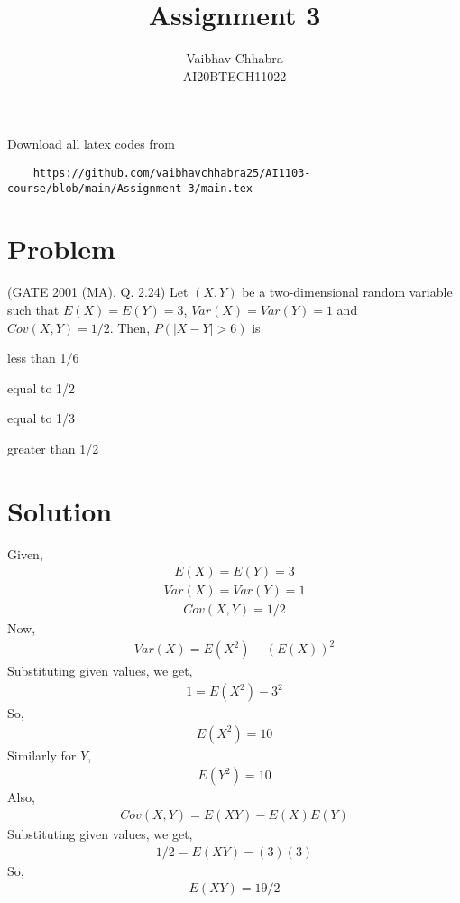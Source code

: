 \documentclass[journal,12pt,twocolumn]{IEEEtran}
\begin{document}
     \def\topbox#1{\raisebox{-\baselineskip}[0in][0in]{#1}}
     \def\midbox#1{\raisebox{-0.5\baselineskip}[0in][0in]{#1}}
\vspace{3cm}
\title{Assignment 3}
\author{Vaibhav Chhabra \\ AI20BTECH11022}
\maketitle
\newpage
\bigskip
\renewcommand{\thefigure}{\theenumi}
\renewcommand{\thetable}{\theenumi}
Download all latex codes from 
\begin{lstlisting}
    https://github.com/vaibhavchhabra25/AI1103-course/blob/main/Assignment-3/main.tex
\end{lstlisting}
\section{Problem}
(GATE 2001 (MA), Q. 2.24)
Let $(X,Y)$ be a two-dimensional random variable such that $E(X)=E(Y)=3$, $Var(X)=Var(Y)=1$ and $Cov(X,Y)=1/2$.
Then, $P(|X-Y|>6)$ is
\begin{enumerate}
\begin{multicols}{2}
    \item less than 1/6
    \item equal to 1/2
    \item equal to 1/3
    \item greater than 1/2
\end{multicols}
\end{enumerate}

\section{Solution}
Given,
\begin{align} \label{eq-1}
    E(X)=E(Y)=3
\end{align}
\begin{align}
    Var(X)=Var(Y)=1
\end{align}
\begin{align}
    Cov(X,Y)=1/2
\end{align}
Now,
\begin{align}
    Var(X)=E(X^2)-(E(X))^2
\end{align}
Substituting given values, we get,
\begin{align}
    1=E(X^2)-3^2
\end{align}
So,
\begin{align} \label{eq-2}
    E(X^2)=10
\end{align}
Similarly for $Y$,
\begin{align} \label{eq-3}
    E(Y^2)=10
\end{align}
Also,
\begin{align}
    Cov(X,Y)=E(XY)-E(X)E(Y)
\end{align}
Substituting given values, we get,
\begin{align}
    1/2=E(XY)-(3)(3)
\end{align}
So,
\begin{align} \label{eq-4}
    E(XY)=19/2
\end{align}
\end{document}
